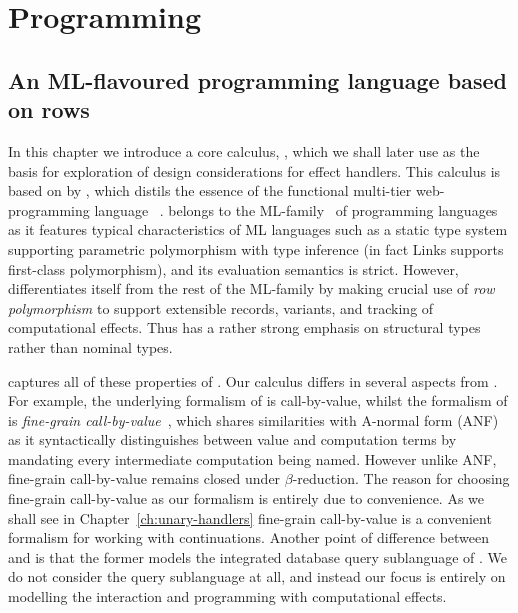 \documentclass[12pt,phd,lfcs,twoside,openright,logo,leftchapter,normalheadings]{infthesis}
\theoremstyle{plain}
\theoremstyle{definition}
\begin{document}
\part{Programming}
\label{p:design}

\chapter{An ML-flavoured programming language based on rows}
\label{ch:base-language}

In this chapter we introduce a core calculus, \BCalc{}, which we shall
later use as the basis for exploration of design considerations for
effect handlers. This calculus is based on \CoreLinks{} by
\citet{LindleyC12}, which distils the essence of the functional
multi-tier web-programming language
\Links{}~\cite{CooperLWY06}. \Links{} belongs to the
ML-family~\cite{MilnerTHM97} of programming languages as it features
typical characteristics of ML languages such as a static type system
supporting parametric polymorphism with type inference (in fact Links
supports first-class polymorphism), and its evaluation semantics is
strict. However, \Links{} differentiates itself from the rest of the
ML-family by making crucial use of \emph{row polymorphism} to support
extensible records, variants, and tracking of computational
effects. Thus \Links{} has a rather strong emphasis on structural
types rather than nominal types.

\CoreLinks{} captures all of these properties of \Links{}. Our
calculus \BCalc{} differs in several aspects from \CoreLinks{}. For
example, the underlying formalism of \CoreLinks{} is call-by-value,
whilst the formalism of \BCalc{} is \emph{fine-grain
  call-by-value}~\cite{LevyPT03}, which shares similarities with
A-normal form (ANF)~\cite{FlanaganSDF93} as it syntactically
distinguishes between value and computation terms by mandating every
intermediate computation being named. However unlike ANF, fine-grain
call-by-value remains closed under $\beta$-reduction. The reason for
choosing fine-grain call-by-value as our formalism is entirely due to
convenience. As we shall see in Chapter~\ref{ch:unary-handlers}
fine-grain call-by-value is a convenient formalism for working with
continuations. Another point of difference between \CoreLinks{} and
\BCalc{} is that the former models the integrated database query
sublanguage of \Links{}. We do not consider the query sublanguage at
all, and instead our focus is entirely on modelling the interaction
and programming with computational effects.
\end{document}

